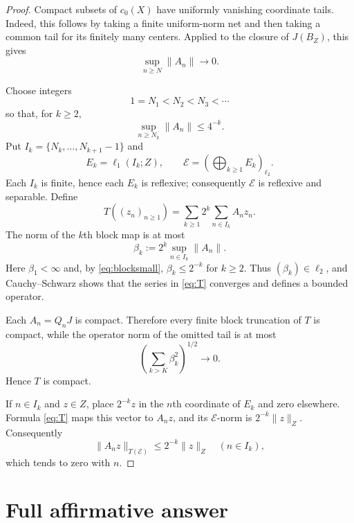 \documentclass[11pt]{article}
\newcommand{\cnull}{c_0(X)}
\begin{document}
\begin{proof}
Compact subsets of $\cnull$ have uniformly vanishing coordinate tails.
Indeed, this follows by taking a finite uniform-norm net and then taking a
common tail for its finitely many centers.  Applied to the closure of
$J(B_Z)$, this gives
\begin{equation}\label{eq:tail}
  \sup_{n\geq N}\|A_n\|\longrightarrow0.
\end{equation}

Choose integers
\[
  1=N_1<N_2<N_3<\cdots
\]
so that, for $k\geq2$,
\begin{equation}\label{eq:blocksmall}
  \sup_{n\geq N_k}\|A_n\|\leq4^{-k}.
\end{equation}
Put $I_k=\{N_k,\ldots,N_{k+1}-1\}$ and
\[
  E_k=\ell_1(I_k;Z),
  \qquad
  \mathcal E=\left(\bigoplus_{k\geq1}E_k\right)_{\ell_2}.
\]
Each $I_k$ is finite, hence each $E_k$ is reflexive; consequently
$\mathcal E$ is reflexive and separable.  Define
\begin{equation}\label{eq:T}
  T((z_n)_{n\geq1})
  =\sum_{k\geq1}2^k\sum_{n\in I_k}A_nz_n.
\end{equation}
The norm of the $k$th block map is at most
\[
  \beta_k:=2^k\sup_{n\in I_k}\|A_n\|.
\]
Here $\beta_1<\infty$ and, by \eqref{eq:blocksmall},
$\beta_k\leq2^{-k}$ for $k\geq2$.  Thus $(\beta_k)\in\ell_2$, and
Cauchy--Schwarz shows that the series in \eqref{eq:T} converges and defines a
bounded operator.

Each $A_n=Q_nJ$ is compact.  Therefore every finite block truncation of $T$
is compact, while the operator norm of the omitted tail is at most
\[
  \left(\sum_{k>K}\beta_k^2\right)^{1/2}\longrightarrow0.
\]
Hence $T$ is compact.

If $n\in I_k$ and $z\in Z$, place $2^{-k}z$ in the $n$th coordinate of
$E_k$ and zero elsewhere.  Formula \eqref{eq:T} maps this vector to $A_nz$,
and its $\mathcal E$-norm is $2^{-k}\|z\|_Z$.  Consequently
\begin{equation}\label{eq:rangenorm}
  \|A_nz\|_{T(\mathcal E)}\leq2^{-k}\|z\|_Z
  \quad(n\in I_k),
\end{equation}
which tends to zero with $n$.
\end{proof}

\section{Full affirmative answer}
\end{document}
